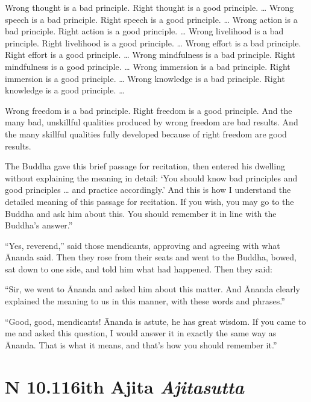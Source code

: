 \documentclass[12pt,openany]{book}%
\newcommand*{\suttatitleacronym}[1]{\smaller[2]{#1}\vspace*{.3em}}
\newcommand*{\suttatitletranslation}[1]{\linebreak{#1}}
\newcommand*{\suttatitleroot}[1]{\linebreak\smaller[2]\itshape{#1}}
\newcommand*{\tocacronym}[1]{\hspace*{-3.3em}{#1}\quad}
\newcommand*{\toctranslation}[1]{#1}
\newcommand*{\tocroot}[1]{(\textit{#1})}
\begin{document}
Wrong thought is a bad principle. Right thought is a good principle. … Wrong speech is a bad principle. Right speech is a good principle. … Wrong action is a bad principle. Right action is a good principle. … Wrong livelihood is a bad principle. Right livelihood is a good principle. … Wrong effort is a bad principle. Right effort is a good principle. … Wrong mindfulness is a bad principle. Right mindfulness is a good principle. … Wrong immersion is a bad principle. Right immersion is a good principle. … Wrong knowledge is a bad principle. Right knowledge is a good principle. … 

Wrong freedom is a bad principle. Right freedom is a good principle. And the many bad, unskillful qualities produced by wrong freedom are bad results. And the many skillful qualities fully developed because of right freedom are good results. 

The Buddha gave this brief passage for recitation, then entered his dwelling without explaining the meaning in detail: ‘You should know bad principles and good principles … and practice accordingly.’ And this is how I understand the detailed meaning of this passage for recitation. If you wish, you may go to the Buddha and ask him about this. You should remember it in line with the Buddha’s answer.” 

“Yes, reverend,” said those mendicants, approving and agreeing with what Ānanda said. Then they rose from their seats and went to the Buddha, bowed, sat down to one side, and told him what had happened. Then they said: 

“Sir, we went to Ānanda and asked him about this matter. And Ānanda clearly explained the meaning to us in this manner, with these words and phrases.” 

“Good, good, mendicants! Ānanda is astute, he has great wisdom. If you came to me and asked this question, I would answer it in exactly the same way as Ānanda. That is what it means, and that’s how you should remember it.” 

%
\section*{{\suttatitleacronym AN 10.116}{\suttatitletranslation With Ajita }{\suttatitleroot Ajitasutta}}
\addcontentsline{toc}{section}{\tocacronym{AN 10.116} \toctranslation{With Ajita } \tocroot{Ajitasutta}}
\end{document}
